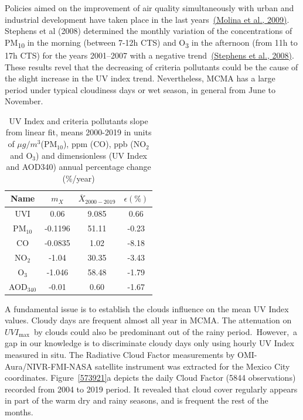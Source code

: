 \documentclass[10pt]{article}
\begin{document}
Policies aimed on the improvement of air quality simultaneously with
urban and industrial development have taken place in the last
years~\hyperref[csl:65]{(Molina et al., 2009)}. Stephens et al (2008) determined the monthly
variation of the concentrations of PM\textsubscript{10} in the morning
(between 7-12h CTS) and O\textsubscript{3} in the afternoon (from 11h to
17h CTS) for the years 2001--2007 with a negative
trend~\hyperref[csl:66]{(Stephens et al., 2008)}. These results revel that the decreasing of
criteria pollutants could be the cause of the slight increase in the UV
index trend. Nevertheless, MCMA has a large period under typical
cloudiness days or wet season, in general from June to November.
\begin{table}[H]
\centering
\begin{tabular}{cccc} \hline
Name &$m_X$ & $\overline{X}_{2000-2019}$ & $\epsilon(\%)$\\ \hline
UVI &0.06 &9.085 &0.66 \\
PM$_{10}$ &-0.1196 & 51.11& -0.23\\ 
CO &-0.0835 &1.02 &-8.18\\ 
NO$_2$ &-1.04 & 30.35 &-3.43\\ 
O$_3$ &-1.046 & 58.48 &-1.79\\ 
AOD$_{340}$ &-0.01 &0.60 &-1.67\\
\hline
\end{tabular}
\caption{{UV Index and criteria pollutants slope from linear fit, means 2000-2019 in units of $\mu g/m^3$(PM$_{10}$), ppm (CO), ppb (NO$_2$ and O$_3$) and dimensionless (UV Index and AOD340) annual percentage change (\%/year)}}
\end{table}

A fundamental issue is to establish the clouds influence on the mean UV
Index values. C{loudy days are frequent almost all year in MCMA. The
attenuation on~\(UVI_{\max}\)~by clouds could also be predominant
out of the rainy period.~However,~a gap in our knowledge is to
discriminate cloudy days only using hourly UV Index measured in situ.
T}he Radiative Cloud Factor measurements by OMI-Aura/NIVR-FMI-NASA
satellite instrument was extracted for the Mexico City coordinates.
Figure~{\ref{573921}}a depicts the daily Cloud Factor
(5844 observations) recorded from 2004 to 2019 period. It revealed that
cloud cover regularly appears in part of the warm dry and rainy seasons,
and is frequent the rest of the months.~
\end{document}
